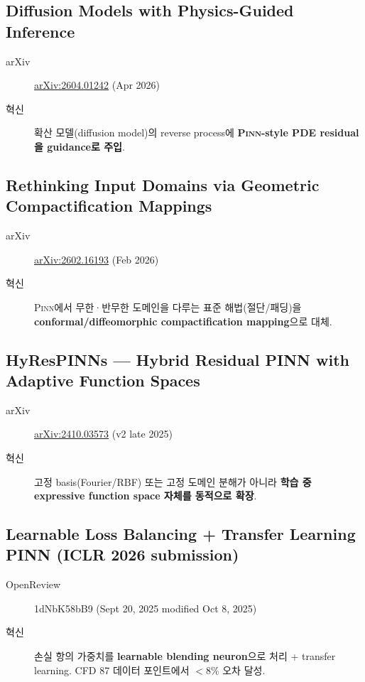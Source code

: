 \documentclass[11pt,a4paper,oneside]{report}
\newcommand{\pinn}{\textsc{Pinn}}
\newcommand{\arxivid}[1]{\href{https://arxiv.org/abs/#1}{arXiv:#1}}
\begin{document}
\subsection{Diffusion Models with Physics-Guided Inference}

\begin{description}
\item[arXiv] \arxivid{2604.01242} (Apr 2026)
\item[혁신] 확산 모델(diffusion model)의 reverse process에 \textbf{\pinn{}-style PDE residual을 guidance로 주입}.
\end{description}

\subsection{Rethinking Input Domains via Geometric Compactification Mappings}

\begin{description}
\item[arXiv] \arxivid{2602.16193} (Feb 2026)
\item[혁신] \pinn{}에서 무한·반무한 도메인을 다루는 표준 해법(절단/패딩)을 \textbf{conformal/diffeomorphic compactification mapping}으로 대체.
\end{description}

\subsection{HyResPINNs --- Hybrid Residual PINN with Adaptive Function Spaces}

\begin{description}
\item[arXiv] \arxivid{2410.03573} (v2 late 2025)
\item[혁신] 고정 basis(Fourier/RBF) 또는 고정 도메인 분해가 아니라 \textbf{학습 중 expressive function space 자체를 동적으로 확장}.
\end{description}

\subsection{Learnable Loss Balancing + Transfer Learning PINN (ICLR 2026 submission)}

\begin{description}
\item[OpenReview] 1dNbK58bB9 (Sept 20, 2025 modified Oct 8, 2025)
\item[혁신] 손실 항의 가중치를 \textbf{learnable blending neuron}으로 처리 + transfer learning. CFD 87 데이터 포인트에서 $<$8\% 오차 달성.
\end{description}
\end{document}
